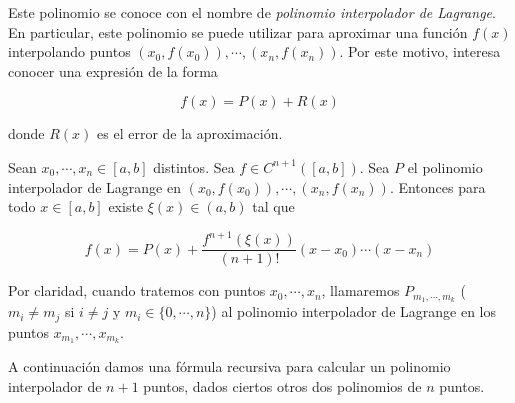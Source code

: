 Este polinomio se conoce con el nombre de \textit{polinomio interpolador de Lagrange}. En particular, este polinomio se puede utilizar para aproximar una función $f(x)$ interpolando puntos $(x_0, f(x_0)), \cdots, (x_n, f(x_n))$. Por este motivo, interesa conocer una expresión de la forma

\[f(x) = P(x) + R(x)\]

donde $R(x)$ es el error de la aproximación.

\begin{propo}
Sean $x_0, \cdots, x_n \in [a, b]$ distintos. Sea $f \in C^{n + 1}([a, b])$. Sea $P$ el polinomio interpolador de Lagrange en $(x_0, f(x_0)), \cdots, (x_n, f(x_n))$. Entonces para todo $x \in [a, b]$ existe $\xi(x) \in (a, b)$ tal que

\[f(x) = P(x) + \frac{f^{n + 1}(\xi(x))}{(n + 1)!} (x - x_0) \cdots (x - x_n)\]
\end{propo}

Por claridad, cuando tratemos con puntos $x_0, \cdots, x_n$, llamaremos $P_{m_1, \cdots, m_k}$ ($m_i \neq m_j$ si $i \neq j$ y $m_i \in \{0, \cdots, n\}$) al polinomio interpolador de Lagrange en los puntos $x_{m_1}, \cdots, x_{m_k}$.

A continuación damos una fórmula recursiva para calcular un polinomio interpolador de $n + 1$ puntos, dados ciertos otros dos polinomios de $n$ puntos.

